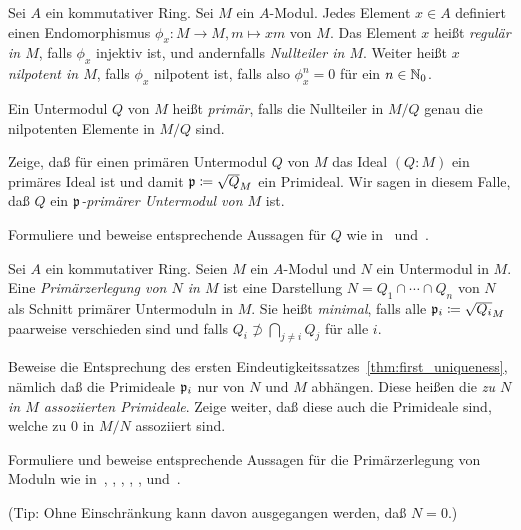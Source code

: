 \begin{exercise}
	Sei \(A\) ein kommutativer Ring. Sei \(M\) ein \(A\)-Modul. Jedes Element
	\(x \in A\) definiert einen Endomorphismus \(\phi_x\colon M \to M,
	m \mapsto x m\) von \(M\). Das Element \(x\) heißt
	\emph{regulär in \(M\)}, falls \(\phi_x\) injektiv ist, und andernfalls
	\emph{Nullteiler in \(M\)}. Weiter heißt \(x\) \emph{nilpotent in \(M\)},
	falls \(\phi_x\) nilpotent ist, falls also \(\phi_x^n = 0\) für ein
	\(n \in \mathbb N_0\).
	
	Ein Untermodul \(Q\) von \(M\) heißt \emph{primär}, falls die Nullteiler
	in \(M/Q\) genau die nilpotenten Elemente in \(M/Q\) sind.
	
	Zeige, daß für einen primären Untermodul \(Q\) von \(M\) das Ideal
	\((Q : M)\) ein primäres Ideal ist und damit \(\mathfrak{p} \coloneqq
	\sqrt{Q}_M\) ein Primideal. Wir sagen in diesem Falle, daß
	\(Q\) ein \emph{\(\mathfrak{p}\)-primärer Untermodul von \(M\)} ist.
	
	Formuliere und beweise entsprechende Aussagen für \(Q\) wie
	in~ und~.
\end{exercise}

\begin{exercise}
	\label{exer:primary_decomp_for_mod}
	Sei \(A\) ein kommutativer Ring. Seien \(M\) ein \(A\)-Modul und
	\(N\) ein Untermodul in \(M\). Eine \emph{Primärzerlegung von \(N\) in
	\(M\)} ist eine Darstellung \(N = Q_1 \cap \dotsb \cap Q_n\) von \(N\)
	als Schnitt primärer Untermoduln in \(M\). Sie heißt \emph{minimal},
	falls alle \(\mathfrak{p}_i \coloneqq \sqrt{Q_i}_M\) paarweise verschieden sind
	und falls \(Q_i \not\supset \bigcap\limits_{j \neq i} Q_j\) für alle \(i\).
	
	Beweise die Entsprechung des ersten
	Eindeutigkeitssatzes~\ref{thm:first_uniqueness}, nämlich daß die
	Primideale \(\mathfrak{p}_i\) nur von \(N\) und \(M\) abhängen. Diese heißen
	die \emph{zu \(N\) in \(M\) assoziierten Primideale}. Zeige weiter, daß
	diese auch die Primideale sind, welche zu \(0\) in \(M/N\) assoziiert sind.
\end{exercise}

\begin{exercise}
	Formuliere und beweise entsprechende Aussagen für die Primärzerlegung von
	Moduln wie
	in~,
	,
	,
	,
	,
	und~.
	
	(Tip: Ohne Einschränkung kann davon ausgegangen werden, daß \(N = 0\).)
\end{exercise}

